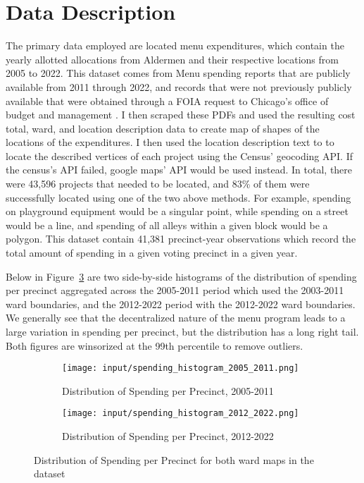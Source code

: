\section{Data Description}\label{sec:data_description}
The primary data employed are located menu expenditures, which contain the yearly allotted allocations from Aldermen and their respective locations from 2005 to 2022.
This dataset comes from Menu spending reports that are publicly available from 2011 through 2022, and records that were not previously publicly available that were obtained through a FOIA request to Chicago's office of budget and management \cite{OBM_datasource}.  
I then scraped these PDFs and used the resulting cost total, ward, and location description data to create map of shapes of the locations of the expenditures.
I then used the location description text to to locate the described vertices of each project using the Census' geocoding API. 
If the census's API failed, google maps' API would be used instead.
In total, there were 43,596 projects that needed to be located, and 83\% of them were successfully located using one of the two above methods.
For example, spending on playground equipment would be a singular point, while spending on a street would be a line, and spending of all alleys within a given block would be a polygon.
This dataset contain 41,381 precinct-year observations which record the total amount of spending in a given voting precinct in a given year.

Below in Figure~\ref*{fig:spending_hist} are two side-by-side histograms of the distribution of spending per precinct aggregated across the 2005-2011 period which used the 2003-2011 ward boundaries, and the 2012-2022 period with the 2012-2022 ward boundaries.
We generally see that the decentralized nature of the menu program leads to a large variation in spending per precinct, but the distribution has a long right tail.
Both figures are winsorized at the 99th percentile to remove outliers.

\begin{figure}[H]
    \centering
    \begin{subfigure}[b]{0.45\textwidth} %
      \texttt{[image: input/spending\_histogram\_2005\_2011.png]}
      \caption{Distribution of Spending per Precinct, 2005-2011}
      \label{fig:sub1}
    \end{subfigure}
    \hfill %
    \begin{subfigure}[b]{0.45\textwidth}
      \texttt{[image: input/spending\_histogram\_2012\_2022.png]}
      \caption{Distribution of Spending per Precinct, 2012-2022}
      \label{fig:sub2}
    \end{subfigure}
  
    \caption{Distribution of Spending per Precinct for both ward maps in the dataset}
    \label{fig:spending_hist}
  \end{figure}

